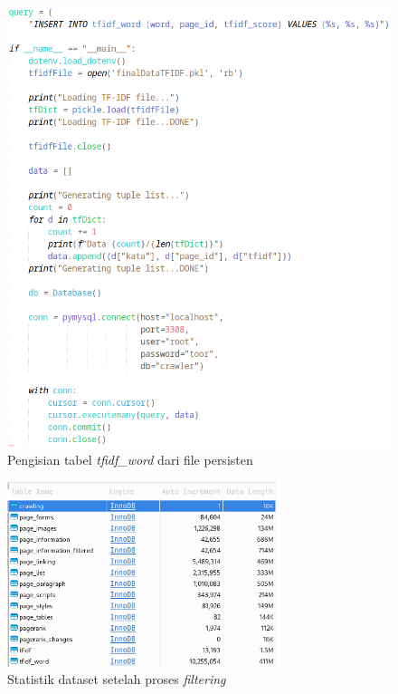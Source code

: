 \begin{figure}[H]
  \centering{}
	\includegraphics[width=\textwidth]{gambar/implementasi_insert_tfidfword.png}
  \caption{Pengisian tabel \textit{tfidf\_word} dari file persisten}
\end{figure}

\begin{figure}[H]
  \centering{}
	\includegraphics[width=0.7\textwidth]{gambar/implementasi_statistik_dataset_filtered}
  \caption{Statistik dataset setelah proses \textit{filtering}}
\end{figure}

